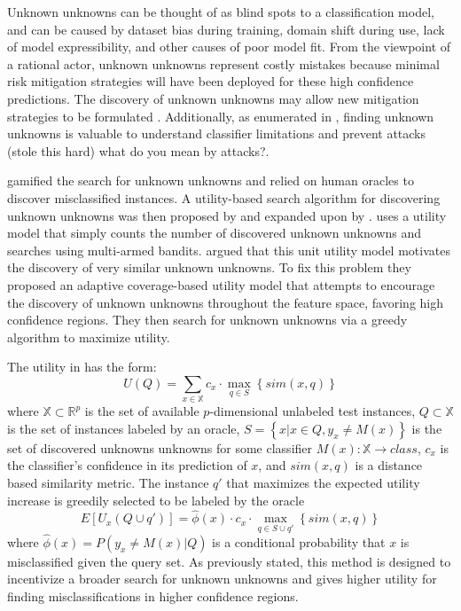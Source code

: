 \documentclass[letterpaper]{article} %
\begin{document}
Unknown unknowns can be thought of as blind spots to a classification model, and can be caused by dataset bias during training, domain shift during use, lack of model expressibility, and other causes of poor model fit.  From the viewpoint of a rational actor, unknown unknowns represent costly mistakes because minimal risk mitigation strategies will have been deployed for these high confidence predictions.  The discovery of unknown unknowns may allow new mitigation strategies to be formulated \citep{Nushi2016a}.  Additionally, as enumerated in \citep{Bansal2018}, finding unknown unknowns is valuable to understand classifier limitations and prevent attacks (stole this hard) what do you mean by attacks?. 

\citet{Attenberg2015} gamified the search for unknown unknowns and relied on human oracles to discover misclassified instances. A utility-based search algorithm for discovering unknown unknowns was then proposed by \citet{Lakkaraju2016} and expanded upon by \citet{Bansal2018}. \citet{Lakkaraju2016} uses a utility model that simply counts the number of discovered unknown unknowns and searches using multi-armed bandits. \citet{Bansal2018} argued that this unit utility model motivates the discovery of very similar unknown unknowns. To fix this problem they proposed an adaptive coverage-based utility model that attempts to encourage the discovery of unknown unknowns throughout the feature space, favoring high confidence regions. They then search for unknown unknowns via a greedy algorithm to maximize utility. 

The utility in \citet{Bansal2018} has the form: $$U(Q) = \sum_{x \in \mathbb{X}} c_x \cdot \max_{q \in S} \left\{sim\left(x,q \right) \right\}$$ where $\mathbb{X} \subset \mathbb{R}^p$ is the set of available $p$-dimensional unlabeled test instances, $Q \subset \mathbb{X}$ is the set of instances labeled by an oracle, $S = \left\{x|x \in Q, y_x \neq M(x)\right\}$ is the set of discovered unknowns unknowns for some classifier $M(x):\mathbb{X} \rightarrow class$, $c_x$ is the classifier's confidence in its prediction of $x$, and $sim(x,q)$ is a distance based similarity metric.  The instance $q'$ that maximizes the expected utility increase is greedily selected to be labeled by the oracle $$E\left[U_x\left(Q \cup q'\right)\right] = \hat{\phi}(x) \cdot c_x \cdot \max_{q \in S \cup q'} \left\{sim\left(x,q \right) \right\}$$ where $\hat{\phi}(x) = P\left(y_x \neq M(x) |Q \right)$ is a conditional probability that $x$ is misclassified given the query set.  As previously stated, this method is designed to incentivize a broader search for unknown unknowns and gives higher utility for finding misclassifications in higher confidence regions.  
\end{document}
